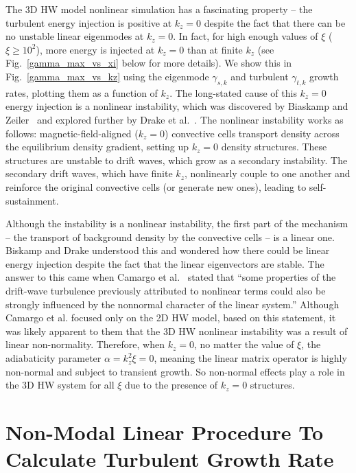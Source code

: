 \documentclass[letter,scriptaddress,twocolumn, prl,showkeys]{revtex4}
\begin{document}
The 3D HW model nonlinear simulation has a fascinating property -- the turbulent energy injection is positive at $k_z = 0$ despite the fact that there can be no unstable linear eigenmodes at $k_z=0$.
In fact, for high enough values of $\xi$ ($\xi \ge 10^2$), more energy is injected at $k_z = 0$ than at finite $k_z$ (see Fig.~\ref{gamma_max_vs_xi} below for more details).
We show this in Fig.~\ref{gamma_max_vs_kz} using the eigenmode $\gamma_{s,k}$ and turbulent $\gamma_{t,k}$ growth rates, plotting them as a function of $k_z$.
The long-stated cause of this $k_z=0$ energy injection is a nonlinear instability, which was discovered by Biaskamp and Zeiler~\cite{biskamp1995} and explored further by Drake et al.~\cite{drake1995}. 
The nonlinear instability works as follows: magnetic-field-aligned ($k_z=0$) convective cells transport density across the equilibrium density gradient, setting up $k_z=0$ density structures. 
These structures are unstable to drift waves, which grow as a secondary instability.
The secondary drift waves, which have finite $k_z$, nonlinearly couple to one another and reinforce the original convective cells (or generate new ones), leading to self-sustainment.

Although the instability is a nonlinear instability, the first part of the mechanism -- the transport of background density by the convective cells -- is a linear one.
Biskamp and Drake understood this and wondered how there could be linear energy injection despite the fact that the linear eigenvectors are stable.
The answer to this came when Camargo et al.~\cite{camargo1998} stated that ``some properties of the drift-wave turbulence
previously attributed to nonlinear terms could also be strongly influenced by the nonnormal character of the linear system.'' Although Camargo et al. focused only on the 2D HW model,
based on this statement, it was likely apparent to them that the 3D HW nonlinear instability was a result of linear non-normality. 
Therefore, when $k_z=0$, no matter the value of $\xi$, the adiabaticity parameter $\alpha = k_z^2 \xi = 0$, meaning the linear matrix operator is highly non-normal and subject to transient growth.
So non-normal effects play a role in the 3D HW system for all $\xi$ due to the presence of $k_z=0$ structures.

\section{Non-Modal Linear Procedure To Calculate Turbulent Growth Rate}
\label{sec_nm_procedure}
\end{document}
